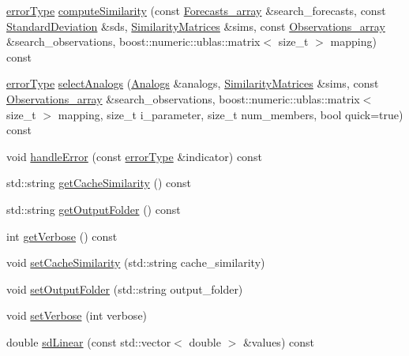 \begin{DoxyCompactItemize}
\item 
\mbox{\hyperlink{class_an_en_a0e256eb89d102d318a47d936b02242bf}{error\+Type}} \mbox{\hyperlink{class_an_en_a24f7aff2ab150077c95481c0a90e35ca}{compute\+Similarity}} (const \mbox{\hyperlink{class_forecasts__array}{Forecasts\+\_\+array}} \&search\+\_\+forecasts, const \mbox{\hyperlink{class_standard_deviation}{Standard\+Deviation}} \&sds, \mbox{\hyperlink{class_similarity_matrices}{Similarity\+Matrices}} \&sims, const \mbox{\hyperlink{class_observations__array}{Observations\+\_\+array}} \&search\+\_\+observations, boost\+::numeric\+::ublas\+::matrix$<$ size\+\_\+t $>$ mapping) const
\item 
\mbox{\hyperlink{class_an_en_a0e256eb89d102d318a47d936b02242bf}{error\+Type}} \mbox{\hyperlink{class_an_en_a8fdd1ef139e17ee4de3744f3913b6d7f}{select\+Analogs}} (\mbox{\hyperlink{class_analogs}{Analogs}} \&analogs, \mbox{\hyperlink{class_similarity_matrices}{Similarity\+Matrices}} \&sims, const \mbox{\hyperlink{class_observations__array}{Observations\+\_\+array}} \&search\+\_\+observations, boost\+::numeric\+::ublas\+::matrix$<$ size\+\_\+t $>$ mapping, size\+\_\+t i\+\_\+parameter, size\+\_\+t num\+\_\+members, bool quick=true) const
\item 
void \mbox{\hyperlink{class_an_en_a2c33c46f4bed8132aa2f6305fa702c0d}{handle\+Error}} (const \mbox{\hyperlink{class_an_en_a0e256eb89d102d318a47d936b02242bf}{error\+Type}} \&indicator) const
\item 
std\+::string \mbox{\hyperlink{class_an_en_aca0d81de024426ac3e2950cffa1f2cd5}{get\+Cache\+Similarity}} () const
\item 
std\+::string \mbox{\hyperlink{class_an_en_a017dc9da4386e61d8cc4d8f5f026628c}{get\+Output\+Folder}} () const
\item 
int \mbox{\hyperlink{class_an_en_aa937a792202a83e88df6e019a991b848}{get\+Verbose}} () const
\item 
void \mbox{\hyperlink{class_an_en_a46995cfbe45b9724a734f3a1a28f1681}{set\+Cache\+Similarity}} (std\+::string cache\+\_\+similarity)
\item 
void \mbox{\hyperlink{class_an_en_a829929424b823440c7e10dbec2979a45}{set\+Output\+Folder}} (std\+::string output\+\_\+folder)
\item 
void \mbox{\hyperlink{class_an_en_af1009201b008da7395f1c1ed0ec287cd}{set\+Verbose}} (int verbose)
\item 
double \mbox{\hyperlink{class_an_en_a7d7b0d5d3a607ebd4b624ddc07e55c57}{sd\+Linear}} (const std\+::vector$<$ double $>$ \&values) const
\item 

\end{DoxyCompactItemize}
